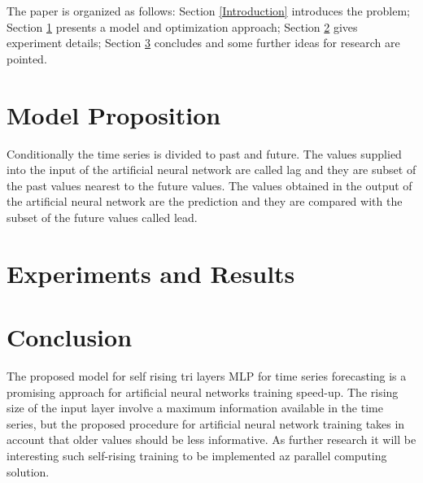 \documentclass[11pt]{article}
\begin{document}
The paper is organized as follows: Section \ref{Introduction} introduces the problem; Section \ref{Model Proposition} presents a model and optimization approach; Section \ref{Experiments and Results} gives experiment details; Section \ref{Conclusion} concludes and some further ideas for research are pointed.

\section{Model Proposition} \label{Model Proposition}

Conditionally the time series is divided to past and future. The values supplied into the input of the artificial neural network are called lag and they are subset of the past values nearest to the future values. The values obtained in the output of the artificial neural network are the prediction and they are compared with the subset of the future values called lead. 

\section{Experiments and Results} \label{Experiments and Results}

\section{Conclusion} \label{Conclusion}

The proposed model for self rising tri layers MLP for time series forecasting is a promising approach for artificial neural networks training speed-up. The rising size of the input layer involve a maximum information available in the time series, but the proposed procedure for artificial neural network training takes in account that older values should be less informative. As further research it will be interesting such self-rising training to be implemented az parallel computing solution. 
\end{document}
